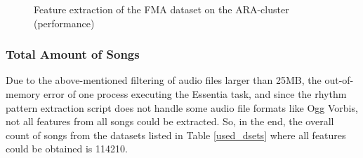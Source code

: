 \begin{figure}[htbp]
	\centering
	\caption{Feature extraction of the FMA dataset on the ARA-cluster (performance)}
	\label{featextclust}
\end{figure}


\subsubsection{Total Amount of Songs}\label{totamsong}

Due to the above-mentioned filtering of audio files larger than 25MB, the out-of-memory error of one process executing the Essentia task, and since the rhythm pattern extraction script does not handle some audio file formats like Ogg Vorbis, not all features from all songs could be extracted. So, in the end, the overall count of songs from the datasets listed in Table \ref{used_dsets} where all features could be obtained is 114210.\\
